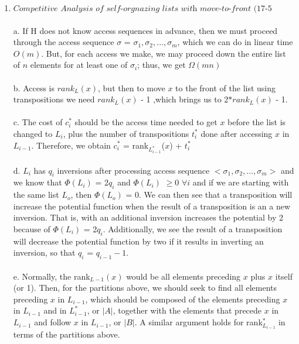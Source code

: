 \documentclass[]{report}
\begin{document}
\begin{enumerate}
	\item $ \textit{Competitive Analysis of self-orgnazing lists with move-to-front (17-5 CLRS)} $
	\\ 
	\\
	a. If H does not know access sequences in advance, then we must proceed through the access sequence $ \sigma $ = $ \sigma_{1}, \sigma_{2}, ... , \sigma_{m}  $, which we can do in linear time $ O(m) $. But, for each access we make, we may proceed down the entire list of $ n $ elements for at least one of $\sigma_{i}$; thus, we get $ \Omega(mn) $ 
	\\
	\\
	b. Access is $rank_{L}(x)$, but then to move $ x $ to the front of the list using transpositions we need $rank_{L}(x)$ - 1 ,which brings us to 2$*rank_{L}(x)$ - 1.
	\\
	\\
	c. The cost of $ c_{i}^{*} $ should be the access time needed to get $ x $ before the list is changed to $ L_{i} $, plus the number of transpositions $ t_{i}^{*} $ done after accessing $ x $ in $ L_{i-1} $. Therefore, we obtain $ c_{i}^{*} $ = rank$_{L_{i-1}^{*}} $($ x $) + $ t_{i}^{*} $
	\\
	\\
	d. $ L_{i} $ has $ q_{i} $ inversions after processing access sequence  $< \sigma_{1}, \sigma_{2}, ... , \sigma_{m}  >$ and we know that $ \Phi(L_{i}) $ = 2$ q_{i} $ and  $ \Phi(L_{i}) $ $\geq  0 $ $ \forall i $ and if we are starting with the same list $ L_{o} $, then $ \Phi(L_{o} ) $ = $0$. We can then see that a transposition will increase the potential function when the result of a transposition is an a new inversion. That is, with an additional inversion increases the potential by 2 because of $ \Phi(L_{i}) $ = 2$ q_{i} $. Additionally, we see the result of a transposition will decrease the potential function by two if it results in inverting an inversion, so that $ q_{i} $ = $ q_{i-1} - 1 $.
	\\
	\\
	e. Normally, the rank$_{L-1}(x) $ would be all elements preceding $ x $ plus $ x $ itself (or 1). Then, for the partitions above, we should seek to find all elements preceding $ x $ in $ L_{i-1} $, which should be composed of the elements preceding $ x $ in $ L_{i-1} $ and in $ L_{i-1}^{*} $, or $|A|$, together with the elements that precede $ x $ in $ L_{i-1} $ and follow $ x $ in $ L_{i-1} $, or $|B|$. A similar argument holds for rank$_{L_{i-1}}^{*} $ in terms of the partitions above.
	\\

\end{enumerate}
\end{document}
